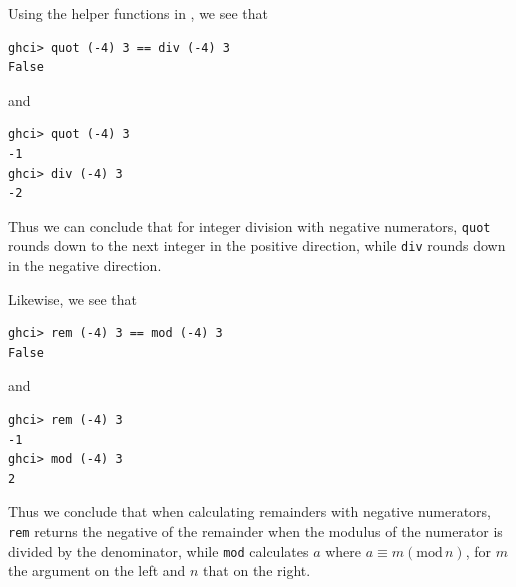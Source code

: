 Using the helper functions in , we see that
\begin{lstlisting}
ghci> quot (-4) 3 == div (-4) 3
False
\end{lstlisting}
and
\begin{lstlisting}
ghci> quot (-4) 3
-1
ghci> div (-4) 3
-2
\end{lstlisting}
Thus we can conclude that for integer division with negative numerators, 
\verb|quot| rounds down to the next integer in the positive direction, 
while \verb|div| rounds down in the negative direction.

Likewise, we see that
\begin{lstlisting}
ghci> rem (-4) 3 == mod (-4) 3
False
\end{lstlisting}
and
\begin{lstlisting}
ghci> rem (-4) 3
-1
ghci> mod (-4) 3
2
\end{lstlisting}
Thus we conclude that when calculating remainders with negative numerators, 
\verb|rem| returns the negative of the remainder when the modulus of the numerator
is divided by the denominator, while \verb|mod| calculates $a$ where 
$a \equiv m (\text{mod}\, n)$, for $m$ the argument on the left and $n$ that on the
right.
